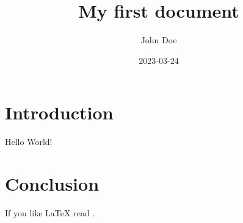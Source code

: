 \documentclass{article}
\title{My first document}
\date{2023-03-24}
\author{John Doe}
\begin{document}
  \maketitle 
  
  \section{Introduction}
  Hello World!

  \section{Conclusion}
  If you like \LaTeX{} read \cite{latexcompanion}. 



  
\end{document}
